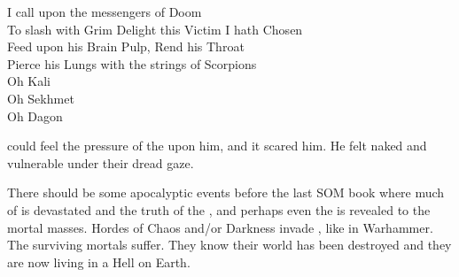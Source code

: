   I call upon the messengers of Doom\\
  To slash with Grim Delight this Victim I hath Chosen\\
  Feed upon his Brain Pulp, Rend his Throat\\
  Pierce his Lungs with the strings of Scorpions\\
  Oh Kali\\
  Oh Sekhmet\\
  Oh Dagon



\Thanatzil could feel the pressure of the \banelords upon him, and it scared him.
He felt naked and vulnerable under their dread gaze.



There should be some apocalyptic events before the last SOM book where much of \Azmith is devastated and the truth of the \xs, \Iquin and perhaps even the \banes is revealed to the mortal masses. 
Hordes of Chaos and/or Darkness invade \Azmith, like in Warhammer. 
The surviving mortals suffer.
They know their world has been destroyed and they are now living in a Hell on Earth.

